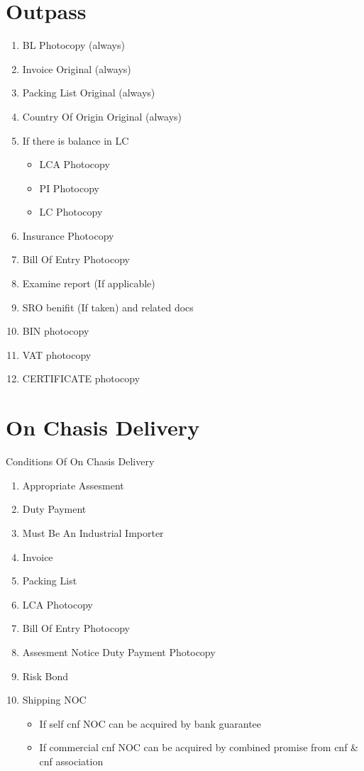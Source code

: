 \documentclass[10pt]{article}
\begin{document}
\section{Outpass}\label{Outpass}
\begin{enumerate}
    \item BL Photocopy (always) 
    \item Invoice Original (always) 
    \item Packing List Original (always) 
    \item Country Of Origin Original (always) 
    \item If there is balance in LC
\begin{itemize}
        \item LCA Photocopy
        \item PI Photocopy
        \item LC Photocopy
\end{itemize}
    \item Insurance Photocopy
    \item Bill Of Entry Photocopy
    \item Examine report (If applicable)
    \item SRO benifit (If taken) and related docs
    \item BIN photocopy
    \item VAT photocopy
    \item CERTIFICATE photocopy
\end{enumerate}

\section{On Chasis Delivery}\label{OnChasisDelivery}
Conditions Of On Chasis Delivery
\begin{enumerate}
    \item Appropriate Assesment
    \item Duty Payment
    \item Must Be An Industrial Importer
    \item Invoice
    \item Packing List
    \item LCA Photocopy
    \item Bill Of Entry Photocopy
    \item Assesment Notice Duty Payment Photocopy
    \item Risk Bond
    \item Shipping NOC
\begin{itemize}
        \item If self cnf NOC can be acquired by bank guarantee
        \item If commercial cnf NOC can be acquired by
            combined promise from cnf \& cnf association
\end{itemize}
\end{enumerate}
\end{document}
